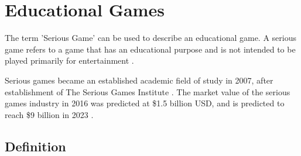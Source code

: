 \documentclass[a4paper,11.5pt]{report}
\numberwithin{figure}{section}
\numberwithin{table}{section}
\numberwithin{equation}{section}
\numberwithin{equation}{section}
\begin{document}





\section{Educational Games}

The term 'Serious Game' can be used to describe an educational game. A serious game refers to a game that has an educational purpose and is not intended to be played primarily for entertainment \citep{abt1970}. 

Serious games became an established academic field of study in 2007, after establishment of The Serious Games Institute \citep{Wilkinson2016}. The market value of the serious games industry in 2016 was predicted at \$1.5 billion USD, and is predicted to reach \$9 billion in 2023 \citep{alliedmarketresearch}.

\subsection{Definition}
\end{document}
